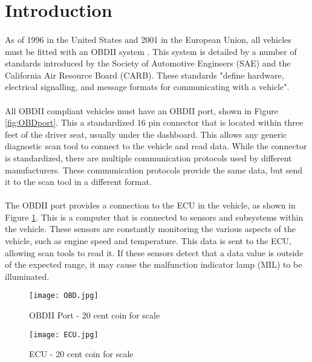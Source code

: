 \section{Introduction}
	\paragraph{}{
	As of 1996 in the United States and 2001 in the European Union, all vehicles must be fitted with an OBDII system \citep{Denton}. This system is detailed by a number of standards introduced by the Society of Automotive Engineers (SAE) and the California Air Resource Board (CARB). These standards "define hardware, electrical signalling, and message formats for communicating with a vehicle". \citep{Cabala}%
	}
	\paragraph{}{
	All OBDII compliant vehicles must have an OBDII port, shown in Figure \ref{fig:OBDport}. This a standardized 16 pin connector that is located within three feet of the driver seat, usually under the dashboard. This allows any generic diagnostic scan tool to connect to the vehicle and read data. While the connector is standardized, there are multiple communication protocols used by different manufacturers. These communication protocols provide the same data, but send it to the scan tool in a different format.
	}
	\paragraph{}{
	The OBDII port provides a connection to the ECU in the vehicle, as shown in Figure \ref{fig:ECU}. This is a computer that is connected to sensors and subsystems within the vehicle. These sensors are constantly monitoring the various aspects of the vehicle, such as engine speed and temperature. This data is sent to the ECU, allowing scan tools to read it. If these sensors detect that a data value is outside of the expected range, it may cause the malfunction indicator lamp (MIL) to be illuminated.
	}
	\begin{figure}[h]
		\begin{center}								
			\begin{minipage}{0.45\textwidth}
				\texttt{[image: OBD.jpg]}
				\caption{OBDII Port - 20 cent coin for scale}						
				\label{fig:OBDport}
			\end{minipage}
			\hfill			
			\begin{minipage}{0.45\textwidth}
				\texttt{[image: ECU.jpg]}
				\caption{ECU - 20 cent coin for scale}
				\label{fig:ECU}
			\end{minipage}									
		\end{center}
	\end{figure}	
\newpage
